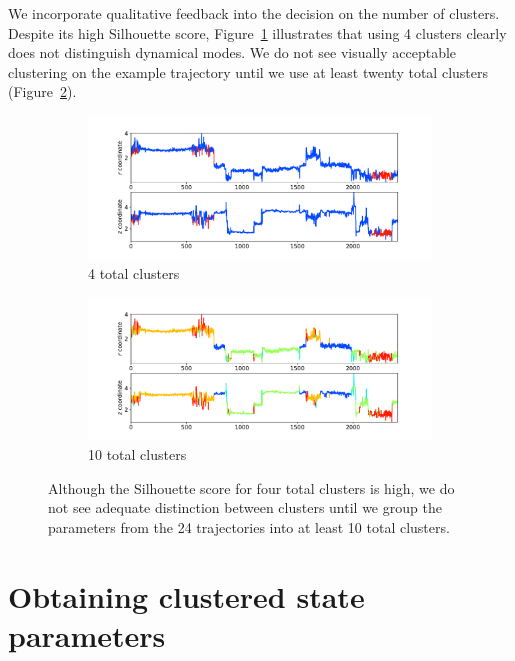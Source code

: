 \documentclass{article}
\begin{document}
  We incorporate qualitative feedback into the decision on the number of 
  clusters. Despite its high Silhouette score, Figure~\ref{fig:4cluster_state_sequence}
  illustrates that using 4 clusters clearly does not distinguish dynamical 
  modes. We do not see visually acceptable clustering on the example trajectory
  until we use at least twenty total clusters (Figure~\ref{fig:20cluster_state_sequence}).
  
  \begin{figure}
  \begin{subfigure}{0.9\textwidth}
  \includegraphics[width=1\textwidth]{clustered_traj_MET_ward_4.pdf}
  \caption{4 total clusters}\label{fig:4cluster_state_sequence}
  \end{subfigure}
  \begin{subfigure}{0.9\textwidth}
  \includegraphics[width=1\textwidth]{clustered_traj_MET_ward_10_nolabel.pdf}
  \caption{10 total clusters}\label{fig:20cluster_state_sequence}
  \end{subfigure}
  \caption{Although the Silhouette score for four total clusters is high, we do
  not see adequate distinction between clusters until we group the parameters
  from the 24 trajectories into at least 10 total clusters.}\label{fig:clustered_state_sequences}
  \end{figure}

  \section{Obtaining clustered state parameters}\label{section:ihmm_procedure}
  
\end{document}
